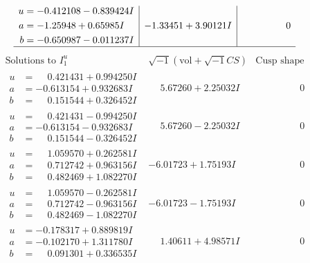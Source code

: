 \documentclass[1p]{elsarticle_modified}
\theoremstyle{definition}
\newcommand{\I}{\sqrt{-1}}
\begin{document}
$$\begin{array}{c|c|c}
\begin{aligned}
u &= -0.412108 - 0.839424 I \\
a &= -1.25948 + 0.65985 I \\
b &= -0.650987 - 0.011237 I\end{aligned}
 & -1.33451 + 3.90121 I & \phantom{-0.000000 } 0\\
 \hline 
 \end{array}$$\newpage$$\begin{array}{c|c|c}  
\text{Solutions to }I^u_{1}& \I (\text{vol} + \sqrt{-1}CS) & \text{Cusp shape}\\
 \hline 
\begin{aligned}
u &= \phantom{-}0.421431 + 0.994250 I \\
a &= -0.613154 + 0.932683 I \\
b &= \phantom{-}0.151544 + 0.326452 I\end{aligned}
 & \phantom{-}5.67260 + 2.25032 I & \phantom{-0.000000 } 0 \\ \hline\begin{aligned}
u &= \phantom{-}0.421431 - 0.994250 I \\
a &= -0.613154 - 0.932683 I \\
b &= \phantom{-}0.151544 - 0.326452 I\end{aligned}
 & \phantom{-}5.67260 - 2.25032 I & \phantom{-0.000000 } 0 \\ \hline\begin{aligned}
u &= \phantom{-}1.059570 + 0.262581 I \\
a &= \phantom{-}0.712742 + 0.963156 I \\
b &= \phantom{-}0.482469 + 1.082270 I\end{aligned}
 & -6.01723 + 1.75193 I & \phantom{-0.000000 } 0 \\ \hline\begin{aligned}
u &= \phantom{-}1.059570 - 0.262581 I \\
a &= \phantom{-}0.712742 - 0.963156 I \\
b &= \phantom{-}0.482469 - 1.082270 I\end{aligned}
 & -6.01723 - 1.75193 I & \phantom{-0.000000 } 0 \\ \hline\begin{aligned}
u &= -0.178317 + 0.889819 I \\
a &= -0.102170 + 1.311780 I \\
b &= \phantom{-}0.091301 + 0.336535 I\end{aligned}
 & \phantom{-}1.40611 + 4.98571 I & \phantom{-0.000000 } 0 \\ \hline\begin{aligned}

\end{aligned}
\end{array}$$
\end{document}
